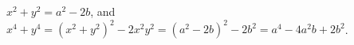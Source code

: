 $x^2+y^2=a^2-2b$, and $x^4+y^4=\left(x^2+y^2\right)^2-2x^2y^2=(a^2-2b)^2-2b^2=\boxed{a^4-4a^2b+2b^2}$.
